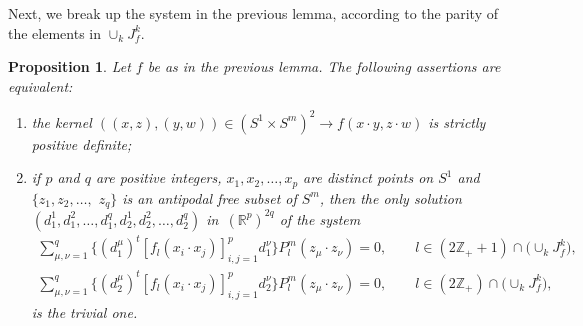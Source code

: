 \documentclass[11pt]{article}
\numberwithin{equation}{section}
\newtheorem{Proposition}[Theorem]{Proposition}
{ \theoremstyle{definition}
\newtheorem{Definition}[Theorem]{Definition}
}
\begin{document}
Next, we break up the system in the previous lemma, according to the parity of the elements in $\cup_{k}J_f^k$.

\begin{Proposition} \label{evenodd}
Let $f$ be as in the previous lemma. The following assertions are equivalent:
\begin{enumerate}\itemsep=0pt
\item[$(i)$] the kernel $((x,z), (y,w)) \in (S^1 \times S^m)^2 \to f(x \cdot y, z \cdot w)$ is strictly positive definite;
\item[$(ii)$] if $p$ and $q$ are positive integers, $x_1,x_2, \ldots, x_p$ are distinct points on $S^1$ and $\{z_1, z_2, \ldots,$ $z_q\}$ is an antipodal free subset of $S^m$, then the only solution $(d_1^1, d_1^2,\ldots, d_1^q, d_2^1,d_2^2, \ldots, d_2^q)$ in~$(\mathbb{R}^{p})^{2q}$ of the system
\begin{gather*}
\sum_{\mu,\nu=1}^q \big\{(d_1^\mu)^t [f_l(x_i \cdot x_j)]_{i,j=1}^p d_1^\nu\big\} P_l^m(z_\mu \cdot z_\nu )=0, \qquad l\in (2\mathbb{Z}_++1) \cap \big(\cup_{k}J_f^k\big),\\
\sum_{\mu,\nu=1}^q \big\{(d_2^\mu)^t [f_l(x_i \cdot x_j)]_{i,j=1}^p d_2^\nu\big\} P_l^m(z_\mu \cdot z_\nu )=0, \qquad l\in (2\mathbb{Z}_+) \cap \big(\cup_{k}J_f^k\big),
\end{gather*}
is the trivial one.
\end{enumerate}
\end{Proposition}
\end{document}
